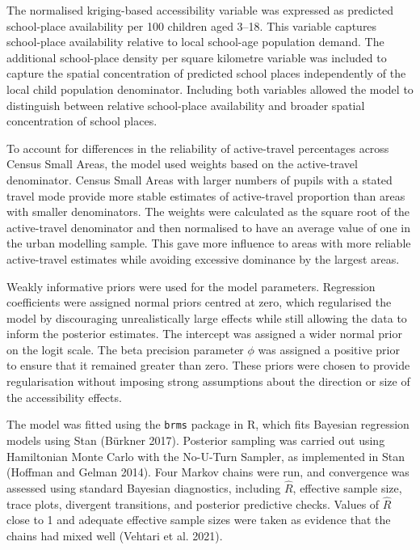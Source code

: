 \documentclass{article}
\begin{document}
The normalised kriging-based accessibility variable was expressed as
predicted school-place availability per 100 children aged 3--18. This
variable captures school-place availability relative to local school-age
population demand. The additional school-place density per square
kilometre variable was included to capture the spatial concentration of
predicted school places independently of the local child population
denominator. Including both variables allowed the model to distinguish
between relative school-place availability and broader spatial
concentration of school places.

To account for differences in the reliability of active-travel
percentages across Census Small Areas, the model used weights based on
the active-travel denominator. Census Small Areas with larger numbers of
pupils with a stated travel mode provide more stable estimates of
active-travel proportion than areas with smaller denominators. The
weights were calculated as the square root of the active-travel
denominator and then normalised to have an average value of one in the
urban modelling sample. This gave more influence to areas with more
reliable active-travel estimates while avoiding excessive dominance by
the largest areas.

Weakly informative priors were used for the model parameters. Regression
coefficients were assigned normal priors centred at zero, which
regularised the model by discouraging unrealistically large effects
while still allowing the data to inform the posterior estimates. The
intercept was assigned a wider normal prior on the logit scale. The beta
precision parameter \(\phi\) was assigned a positive prior to ensure
that it remained greater than zero. These priors were chosen to provide
regularisation without imposing strong assumptions about the direction
or size of the accessibility effects.

The model was fitted using the \texttt{brms} package in R, which fits
Bayesian regression models using Stan (Bürkner 2017). Posterior sampling
was carried out using Hamiltonian Monte Carlo with the No-U-Turn
Sampler, as implemented in Stan (Hoffman and Gelman 2014). Four Markov
chains were run, and convergence was assessed using standard Bayesian
diagnostics, including \(\hat{R}\), effective sample size, trace plots,
divergent transitions, and posterior predictive checks. Values of
\(\hat{R}\) close to 1 and adequate effective sample sizes were taken as
evidence that the chains had mixed well (Vehtari et al. 2021).
\end{document}
